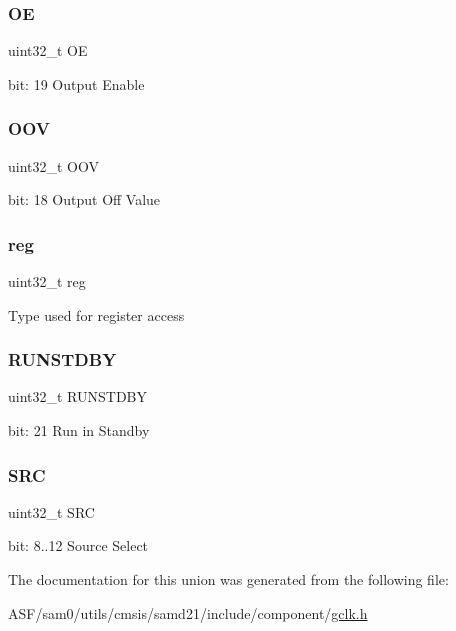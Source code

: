 \subsubsection{\texorpdfstring{OE}{OE}}
{\footnotesize\ttfamily uint32\+\_\+t OE}

bit\+: 19 Output Enable \mbox{\label{union_g_c_l_k___g_e_n_c_t_r_l___type_aa77cb6d1b8627551266e155a3bf4d204}} 
\subsubsection{\texorpdfstring{OOV}{OOV}}
{\footnotesize\ttfamily uint32\+\_\+t O\+OV}

bit\+: 18 Output Off Value \mbox{\label{union_g_c_l_k___g_e_n_c_t_r_l___type_a6b91636401516a477989a336376d7b40}} 
\subsubsection{\texorpdfstring{reg}{reg}}
{\footnotesize\ttfamily uint32\+\_\+t reg}

Type used for register access \mbox{\label{union_g_c_l_k___g_e_n_c_t_r_l___type_a5656560aef3eaf5aac89b68b9fe39c3a}} 
\subsubsection{\texorpdfstring{RUNSTDBY}{RUNSTDBY}}
{\footnotesize\ttfamily uint32\+\_\+t R\+U\+N\+S\+T\+D\+BY}

bit\+: 21 Run in Standby \mbox{\label{union_g_c_l_k___g_e_n_c_t_r_l___type_a306a1d33a25b1f2253b4b855b6e8c0d5}} 
\subsubsection{\texorpdfstring{SRC}{SRC}}
{\footnotesize\ttfamily uint32\+\_\+t S\+RC}

bit\+: 8..12 Source Select 

The documentation for this union was generated from the following file\+:\begin{DoxyCompactItemize}
\item 
A\+S\+F/sam0/utils/cmsis/samd21/include/component/\mbox{\hyperlink{utils_2cmsis_2samd21_2include_2component_2gclk_8h}{gclk.\+h}}\end{DoxyCompactItemize}

